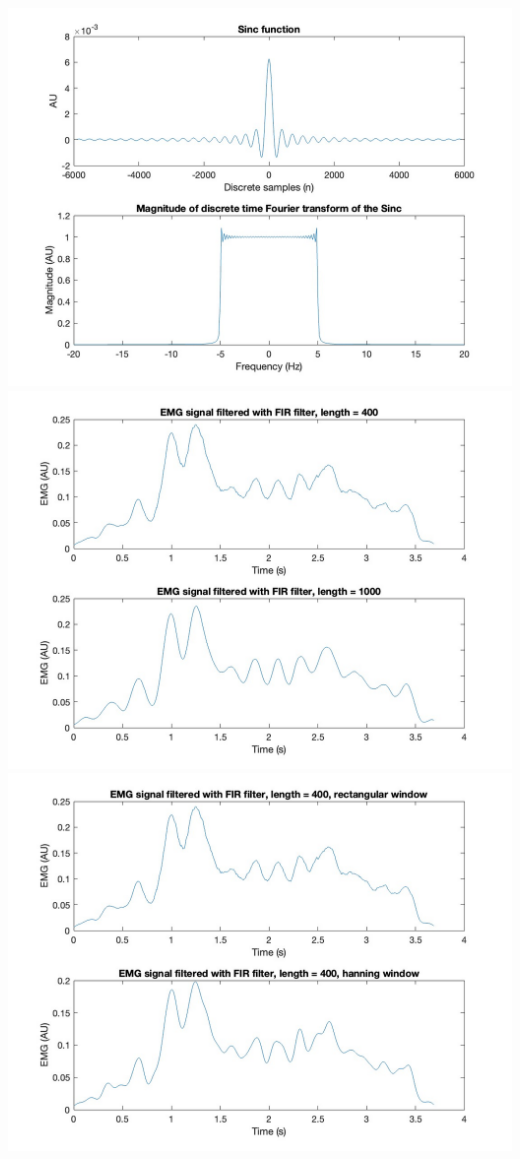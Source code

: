 \documentclass[8pt]{article}  %
\theoremstyle{plain}
\theoremstyle{definition}
\theoremstyle{remark}
\begin{document}
    \begin{minipage}{0.49\textwidth}
    \includegraphics[width=\linewidth]{figure/figure_4.jpg}
    \label{fig:sinc}
    \includegraphics[width=\linewidth]{figure/figure_6.jpg}
    \label{fig:FIR-filters}
    \includegraphics[width=\linewidth]{figure/figure_7.jpg}

\end{minipage}
\end{document}
